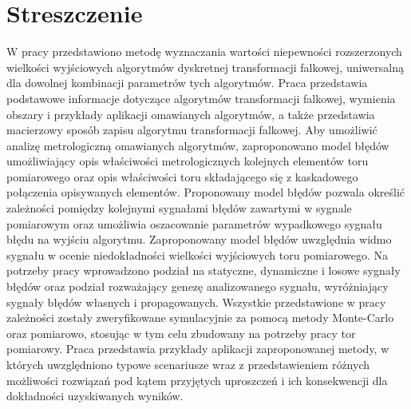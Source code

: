 \chapter*{Streszczenie}

W pracy przedstawiono metodę wyznaczania wartości niepewności rozszerzonych wielkości wyjściowych algorytmów dyskretnej transformacji falkowej, uniwersalną dla dowolnej kombinacji parametrów tych algorytmów. Praca przedstawia podstawowe informacje dotyczące algorytmów transformacji falkowej, wymienia obszary i przykłady aplikacji omawianych algorytmów, a także przedstawia macierzowy sposób zapisu algorytmu transformacji falkowej. Aby umożliwić analizę metrologiczną omawianych algorytmów, zaproponowano model błędów umożliwiający opis właściwości metrologicznych kolejnych elementów toru pomiarowego oraz opis właściwości toru składającego się z kaskadowego połączenia opisywanych elementów. Proponowany model błędów pozwala określić zależności pomiędzy kolejnymi sygnałami błędów zawartymi w sygnale pomiarowym oraz umożliwia oszacowanie parametrów wypadkowego sygnału błędu na wyjściu algorytmu. Zaproponowany model błędów uwzględnia widmo sygnału w ocenie niedokładności wielkości wyjściowych toru pomiarowego. Na potrzeby pracy wprowadzono podział na statyczne, dynamiczne i losowe sygnały błędów oraz podział rozważający genezę analizowanego sygnału, wyróżniający sygnały błędów własnych i propagowanych. Wszystkie przedstawione w pracy zależności zostały zweryfikowane symulacyjnie za pomocą metody Monte-Carlo oraz pomiarowo, stosując w tym celu zbudowany na potrzeby pracy tor pomiarowy. Praca przedstawia przykłady aplikacji zaproponowanej metody, w których uwzględniono typowe scenariusze wraz z przedstawieniem różnych możliwości rozwiązań pod kątem przyjętych uproszczeń i ich konsekwencji dla dokładności uzyskiwanych wyników.
